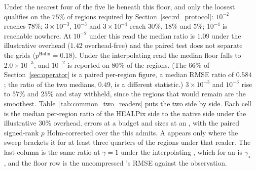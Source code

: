 Under the nearest  four of the five  lie beneath this
floor, and only the loosest qualifies on the $75\%$ of regions required
by Section~\ref{sec:rd_protocol}: $10^{-2}$ reaches $78\%$;
$3\times10^{-3}$, $10^{-3}$ and $3\times10^{-4}$ reach $30\%$, $18\%$ and
$5\%$; $10^{-4}$ is reachable nowhere. At $10^{-2}$ under this read the
median ratio is $1.09$ under the illustrative overhead ($1.42$
overhead-free) and the paired test does not separate the grids
($p^{\mathrm{Holm}}=0.18$). Under the interpolating read the median
floor falls to $2.0\times10^{-3}$, and $10^{-2}$ is reported on $80\%$
of the regions. (The $66\%$ of Section~\ref{sec:operator} is a
paired per-region figure, a median RMSE ratio of $0.584$; the ratio of
the two medians, $0.49$, is a different statistic.) $3\times10^{-3}$ and $10^{-3}$ rise to $57\%$ and $25\%$ and
stay withheld, since the regions that would remain are the smoothest.
Table~\ref{tab:common_two_readers} puts the two  side by side. Each
cell is the median per-region ratio of the HEALPix side to the native
side under the illustrative $30\%$ overhead, errors at a budget and sizes
at an , with the paired signed-rank $p$ Holm-corrected over
the  this  admits. A  appears only where the sweep
brackets it for at least three quarters of the regions under that
reader. The last column is the same ratio at $\gamma=1$ under the
interpolating , which for an  is $\gamma_\star$, and the
floor row is the uncompressed 's RMSE against the observation.



